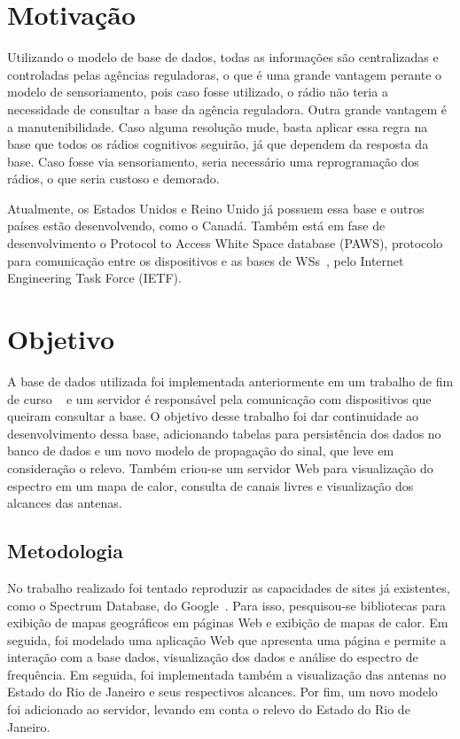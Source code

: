 \section{Motivação}

Utilizando o modelo de base de dados, todas as informações são centralizadas e controladas pelas agências reguladoras, o que é uma grande vantagem perante o modelo de sensoriamento, pois caso fosse utilizado, o rádio não teria a necessidade de consultar a base da agência reguladora. Outra grande vantagem é a manutenibilidade. Caso alguma resolução mude, basta aplicar essa regra na base que todos os rádios cognitivos seguirão, já que dependem da resposta da base. Caso fosse via sensoriamento, seria necessário uma reprogramação dos rádios, o que seria custoso e demorado.

Atualmente, os Estados Unidos e Reino Unido já possuem essa base e outros países estão desenvolvendo, como o Canadá.
Também está em fase de desenvolvimento o Protocol to Access White Space database (PAWS), protocolo para comunicação entre os dispositivos e as bases de WSs~\cite{RFC6953}, pelo Internet Engineering Task Force (IETF).


\section{Objetivo}

A base de dados utilizada foi implementada anteriormente em um trabalho de fim de curso ~\cite{tccmarcelo} e um servidor é responsável pela comunicação com dispositivos que queiram consultar a base. O objetivo desse trabalho foi dar continuidade ao desenvolvimento dessa base, adicionando tabelas para persistência dos dados no banco de dados e um novo modelo de propagação do sinal, que leve em consideração o relevo. Também criou-se um servidor Web para visualização do espectro em um mapa de calor, consulta de canais livres e visualização dos alcances das antenas.

\subsection{Metodologia}

No trabalho realizado foi tentado reproduzir as capacidades de sites já existentes, como o Spectrum Database, do Google~\cite{googlespectrumdatabase}. Para isso, pesquisou-se bibliotecas para exibição de mapas geográficos em páginas Web e exibição de mapas de calor. Em seguida, foi modelado uma aplicação Web que apresenta uma página e permite a interação com a base dados, visualização dos dados e análise do espectro de frequência. Em seguida, foi implementada também a visualização das antenas no Estado do Rio de Janeiro e seus respectivos alcances. Por fim, um novo modelo foi adicionado ao servidor, levando em conta o relevo do Estado do Rio de Janeiro.


